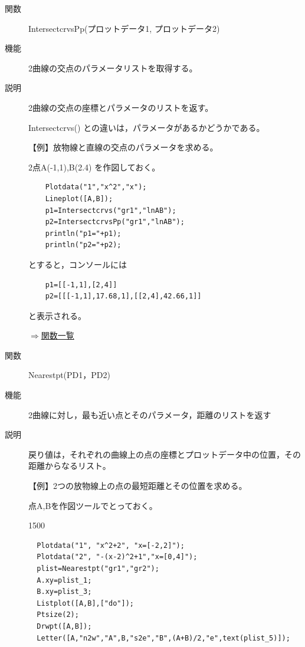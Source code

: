 \documentclass[papersize,a4paper,12pt,uplatex]{jsarticle}
\begin{document}
\begin{description}
\vspace{\baselineskip}
\hypertarget{intersectcrvspp}{}
\item[関数]  IntersectcrvsPp(プロットデータ1, プロットデータ2)
\item[機能]  2曲線の交点のパラメータリストを取得する。
\item[説明]  2曲線の交点の座標とパラメータのリストを返す。

Intersectcrvs() との違いは，パラメータがあるかどうかである。

\vspace{\baselineskip}
【例】放物線と直線の交点のパラメータを求める。

2点A(-1,1),B(2.4) を作図しておく。
\begin{verbatim}
    Plotdata("1","x^2","x");
    Lineplot([A,B]);
    p1=Intersectcrvs("gr1","lnAB");
    p2=IntersectcrvsPp("gr1","lnAB");
    println("p1="+p1);
    println("p2="+p2);
\end{verbatim}
とすると，コンソールには
\begin{verbatim}
    p1=[[-1,1],[2,4]] 
    p2=[[[-1,1],17.68,1],[[2,4],42.66,1]]
\end{verbatim}
と表示される。
\begin{flushright}  \hyperlink{functionlist}{$\Rightarrow$関数一覧}\end{flushright}

\vspace{\baselineskip}
\hypertarget{nearestpt}{}
\item[関数]  Nearestpt(PD1，PD2)
\item[機能]  2曲線に対し，最も近い点とそのパラメータ，距離のリストを返す
\item[説明]  戻り値は，それぞれの曲線上の点の座標とプロットデータ中の位置，その距離からなるリスト。

\vspace{\baselineskip}
【例】2つの放物線上の点の最短距離とその位置を求める。

点A,Bを作図ツールでとっておく。

\begin{layer}{150}{0}
\end{layer}

\begin{verbatim}
  Plotdata("1", "x^2+2", "x=[-2,2]");
  Plotdata("2", "-(x-2)^2+1","x=[0,4]");
  plist=Nearestpt("gr1","gr2");
  A.xy=plist_1;
  B.xy=plist_3;
  Listplot([A,B],["do"]);
  Ptsize(2);
  Drwpt([A,B]);
  Letter([A,"n2w","A",B,"s2e","B",(A+B)/2,"e",text(plist_5)]);
\end{verbatim}


\end{description}
\end{document}
